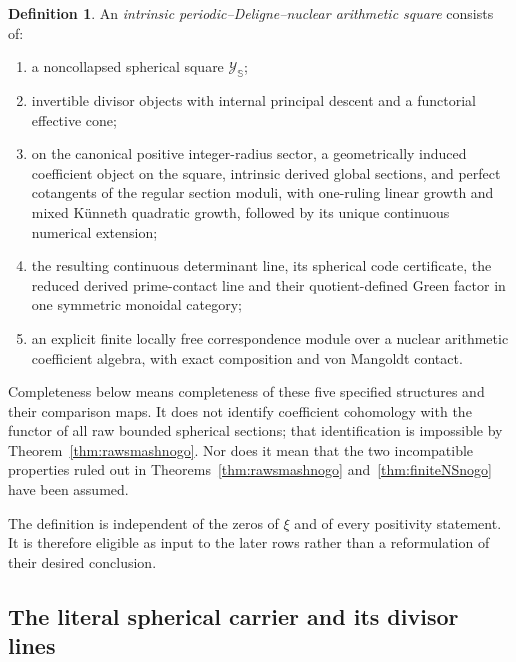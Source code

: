 \documentclass[11pt]{amsart}
\theoremstyle{definition}
\newtheorem{definition}[theorem]{Definition}
\theoremstyle{remark}
\begin{document}
\begin{definition}\label{def:strongrowa}
An \emph{intrinsic periodic--Deligne--nuclear arithmetic square} consists of:
\begin{enumerate}
\item a noncollapsed spherical square $\mathscr Y_{\mathbb S}$;
\item invertible divisor objects with internal principal descent and a
functorial effective cone;
\item on the canonical positive integer-radius sector, a geometrically
induced coefficient object on the square, intrinsic derived global sections,
and perfect cotangents of the regular section moduli, with one-ruling linear
growth and mixed K\"unneth quadratic growth, followed by its unique
continuous numerical extension;
\item the resulting continuous determinant line, its spherical code
certificate, the reduced derived prime-contact line and their
quotient-defined Green factor in one symmetric monoidal category;
\item an explicit finite locally free correspondence module over a nuclear
arithmetic coefficient algebra, with exact composition and von Mangoldt
contact.
\end{enumerate}
Completeness below means completeness of these five specified structures
and their comparison maps.  It does not identify coefficient cohomology
with the functor of all raw bounded spherical sections; that identification
is impossible by Theorem~\ref{thm:rawsmashnogo}.  Nor does it mean that the
two incompatible properties ruled out in
Theorems~\ref{thm:rawsmashnogo} and~\ref{thm:finiteNSnogo} have been assumed.
\end{definition}

The definition is independent of the zeros of $\xi$ and of every positivity
statement.  It is therefore eligible as input to the later rows rather than
a reformulation of their desired conclusion.

\subsection{The literal spherical carrier and its divisor lines}
\end{document}
